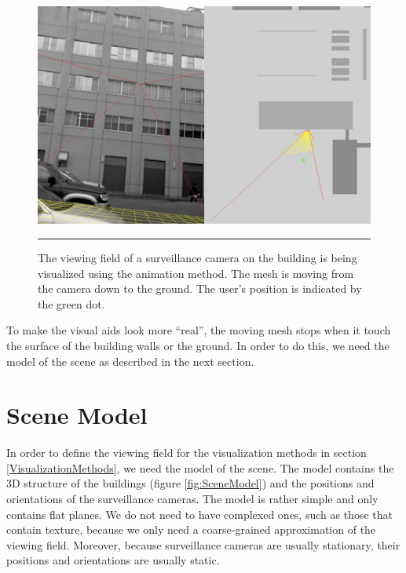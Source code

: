 \begin{figure}[htbp]
	\centering
	\includegraphics[width=14cm]{./Primitives/theory_animation.png}
	\rule{35em}{0.5pt}
	\caption[Animation method]{The viewing field of a surveillance camera on the building is being visualized using the animation method. The mesh is moving from the camera down to the ground. The user's position is indicated by the green dot.}
	\label{fig:AnimationMethod}
\end{figure}

To make the visual aids look more ``real'', the moving mesh stops when it touch the surface of the building walls or the ground. In order to do this, we need the model of the scene as described in the next section.

\section{Scene Model}
\label{SceneModel}

In order to define the viewing field for the visualization methods in section \ref{VisualizationMethods}, we need the model of the scene. The model contains the 3D structure of the buildings (figure \ref{fig:SceneModel}) and the positions and orientations of the surveillance cameras. The model is rather simple and only contains flat planes. We do not need to have complexed ones, such as those that contain texture, because we only need a coarse-grained approximation of the viewing field. Moreover, because surveillance cameras are usually stationary, their positions and orientations are usually static.

